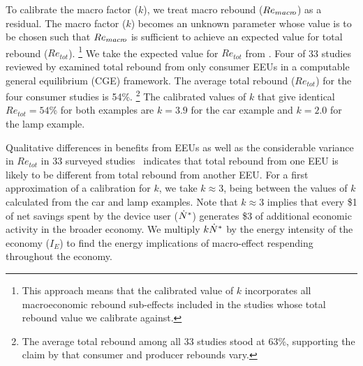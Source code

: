 \documentclass[12pt]{article}\usepackage[]{graphicx}\usepackage[]{xcolor}
\begin{document}
To calibrate the macro factor ($k$),
we treat macro rebound ($Re_{macr\!o}$) as a residual.
The macro factor ($k$) becomes an unknown parameter whose value is to be chosen
such that $Re_{macr\!o}$
is sufficient to achieve an expected value for total rebound ($Re_{tot}$).%
\footnote{
  This approach means that the calibrated value of $k$ incorporates all 
  macroeconomic rebound sub-effects included in the studies
  whose total rebound value we calibrate against.
}
%
We take the expected value for $Re_{tot}$ from 
\citet{Brockway:2021ww}.
Four of 33 studies reviewed by \citet{Brockway:2021ww}
examined total rebound from only consumer EEUs in a computable general
equilibrium (CGE) framework. 
The average total rebound ($Re_{tot}$) 
for the four consumer studies is 54\%.%
\footnote{
  The average total rebound among all 33 studies stood at 63\%,
  supporting the claim by \citet{Turner:2013aa} that consumer
  and producer rebounds vary.
}
%
The calibrated values of $k$ that give identical 
$Re_{tot} = 54$\% 
for both examples are
$k = 3.9$
for the car example and
$k = 2.0$ 
for the lamp example.

Qualitative differences in benefits from EEUs as well as the considerable 
variance in $Re_{tot}$ in 33 surveyed studies~\citep{Brockway:2021ww}
indicates that total rebound from one EEU is likely to be different from 
total rebound from another EEU. 
For a first approximation of a calibration for $k$,
we take $k \approx 3$,
being between the values of $k$ 
calculated from the car and lamp examples.
Note that $k \approx 3$ implies that 
every \$1 of net savings spent by the device user (${\dot{N}}^*$)
generates \$3 of additional economic 
activity in the broader economy.
We multiply $k {\dot{N}}^*$ by the energy intensity of the economy ($I_E$) to 
find the energy implications of macro-effect respending throughout the economy.
\end{document}

